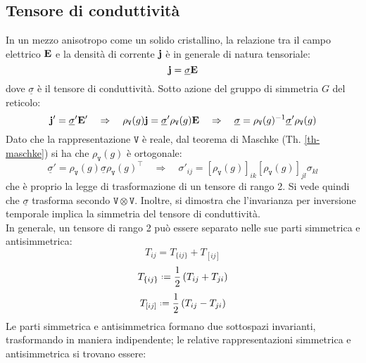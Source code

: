 \subsection{Tensore di conduttività}

In un mezzo anisotropo come un solido cristallino, la relazione tra il campo elettrico $ \mathbf{E} $ e la densità di corrente $ \mathbf{j} $ è in generale di natura tensoriale:
\begin{equation*}
	\mathbf{j} = \underline{\sigma} \mathbf{E}
\end{equation*}
dove $ \underline{\sigma} $ è il tensore di conduttività. Sotto azione del gruppo di simmetria $ G $ del reticolo:
\begin{equation*}
	\mathbf{j}' = \underline{\sigma}' \mathbf{E}'
	\quad \Rightarrow \quad
	\rho_{\mathtt{V}}(g) \mathbf{j} = \underline{\sigma}' \rho_{\mathtt{V}}(g) \mathbf{E}
	\quad \Rightarrow \quad
	\underline{\sigma} = \rho_{\mathtt{V}}(g)^{-1} \underline{\sigma}' \rho_{\mathtt{V}}(g)
\end{equation*}
Dato che la rappresentazione $ \mathtt{V} $ è reale, dal teorema di Maschke (Th. \ref{th-maschke}) si ha che $ \rho_{\mathtt{V}}(g) $ è ortogonale:
\begin{equation*}
	\underline{\sigma}' = \rho_{\mathtt{V}}(g) \underline{\sigma} \rho_{\mathtt{V}}(g)^{\intercal}
	\quad \Rightarrow \quad
	\sigma'_{ij} = [\rho_{\mathtt{V}}(g)]_{ik} [\rho_{\mathtt{V}}(g)]_{jl} \sigma_{kl}
\end{equation*}
che è proprio la legge di trasformazione di un tensore di rango 2. Si vede quindi che $ \underline{\sigma} $ trasforma secondo $ \mathtt{V} \otimes \mathtt{V} $. Inoltre, si dimostra che l'invarianza per inversione temporale implica la simmetria del tensore di conduttività.\\
In generale, un tensore di rango 2 può essere separato nelle sue parti simmetrica e antisimmetrica:
\begin{equation}
	T_{ij} = T_{\{ij\}} + T_{[ij]}
	\label{eq:8.32}
\end{equation}
\begin{equation}
	T_{\{ij\}} \defeq \frac{1}{2} \left( T_{ij} + T_{ji} \right)
	\label{eq:8.33}
\end{equation}
\begin{equation}
	T_{[ij]} \defeq \frac{1}{2} \left( T_{ij} - T_{ji} \right)
	\label{eq:8.34}
\end{equation}
Le parti simmetrica e antisimmetrica formano due sottospazi invarianti, trasformando in maniera indipendente; le relative rappresentazioni simmetrica e antisimmetrica si trovano essere:
